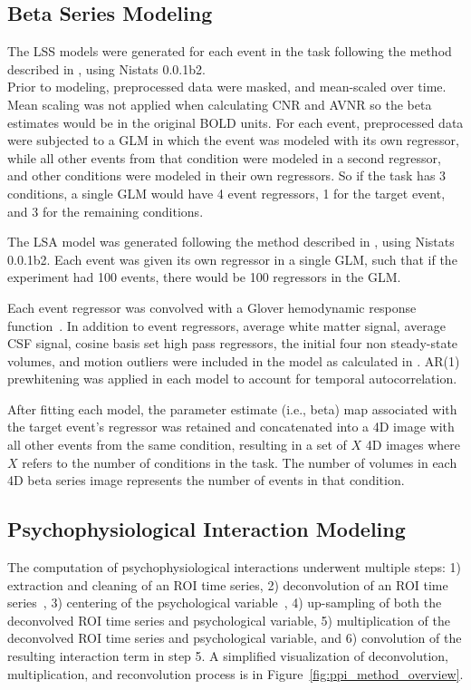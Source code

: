\documentclass[phd,figures,tables,ackpage,abstractpage,publicabstractpage]{uithesis}
\begin{document}
\subsection{Beta Series Modeling}
\label{methods:bsc_model2}

The LSS models were generated for each event in
the task following the method described in \cite[Turner (2012)]{Turner2012a}, using
Nistats 0.0.1b2.\\
Prior to modeling, preprocessed data were masked, and mean-scaled over
time.
Mean scaling was not applied when calculating CNR and AVNR so the
beta estimates would be in the original BOLD units.
For each event, preprocessed data were subjected to a GLM
in which the event was modeled with its own regressor, while
all other events from that condition were modeled in a second regressor,
and other conditions were modeled in their own regressors.
So if the task has 3 conditions, 
a single GLM would have 4 event regressors, 1 for the target
event, and 3 for the remaining conditions.

The LSA model was generated following the method described in
\cite[Rissman (2004)]{Rissman2004}, using Nistats 0.0.1b2.
Each event was given its own regressor in a single GLM, such that
if the experiment had 100 events, there would be 100 regressors in the GLM.

Each event regressor was convolved with a Glover hemodynamic response
function~\cite{Glover1999}.
In addition to event regressors, average white matter signal, average CSF signal,
cosine basis set high pass regressors, the initial four non steady-state volumes, 
and motion outliers were included
in the model as calculated in .
AR(1) prewhitening was applied in each model to account
for temporal autocorrelation.

After fitting each model, the parameter estimate (i.e., beta) map
associated with the target event's regressor was retained and
concatenated into a 4D image with all other events from the same
condition, resulting in a set of $X$ 4D images where $X$ refers to the
number of conditions in the task.
The number of volumes in each 4D beta series image
represents the number of events in that condition.


\subsection{Psychophysiological Interaction Modeling}

The computation of psychophysiological interactions underwent multiple steps:
1) extraction and cleaning of an ROI time series,
2) deconvolution of an ROI time series~\cite{Gitelman2003},
3) centering of the psychological variable~\cite{Di2017},
4) up-sampling of both the deconvolved ROI time series and psychological variable,
5) multiplication of the deconvolved ROI time series and psychological variable, and
6) convolution of the resulting interaction term in step 5.
A simplified visualization of deconvolution, multiplication,
and reconvolution process is in Figure~\ref{fig:ppi_method_overview}.
\end{document}

